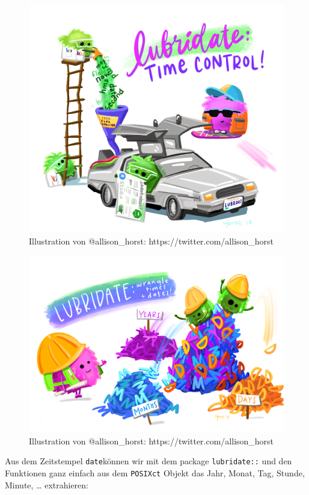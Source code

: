 \documentclass[
]{article}
\begin{document}
\begin{figure}

{\centering \includegraphics[width=0.49\linewidth]{images/035} 

}

\caption{Illustration von @allison_horst: https://twitter.com/allison_horst}\label{fig:unnamed-chunk-113-1}
\end{figure}
\begin{figure}

{\centering \includegraphics[width=0.49\linewidth]{images/036} 

}

\caption{Illustration von @allison_horst: https://twitter.com/allison_horst}\label{fig:unnamed-chunk-113-2}
\end{figure}

Aus dem Zeitstempel \texttt{date}können wir mit dem package \texttt{lubridate::} und den Funktionen ganz einfach aus dem \texttt{POSIXct} Objekt das Jahr, Monat, Tag, Stunde, Minute, \ldots{} extrahieren:
\end{document}
